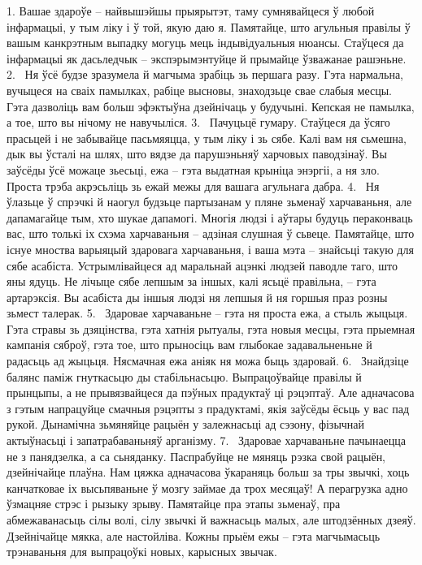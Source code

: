 1. Вашае здароўе – найвышэйшы прыярытэт, таму сумнявайцеся ў любой інфармацыі, у тым ліку і ў той, якую даю я. Памятайце, што агульныя правілы ў вашым канкрэтным выпадку могуць мець індывідуальныя нюансы. Стаўцеся да інфармацыі як дасьледчык – экспэрымэнтуйце й прымайце ўзважанае рашэньне.
2.  Ня ўсё будзе зразумела й магчыма зрабіць зь першага разу. Гэта нармальна, вучыцеся на сваіх памылках, рабіце высновы, знаходзьце свае слабыя месцы. Гэта дазволіць вам больш эфэктыўна дзейнічаць у будучыні. Кепская не памылка, а тое, што вы нічому не навучыліся.
3.  Пачуцьцё гумару. Стаўцеся да ўсяго прасьцей і не забывайце пасьмяяцца, у тым ліку і зь сябе. Калі вам ня сьмешна, дык вы ўсталі на шлях, што вядзе да парушэньняў харчовых паводзінаў. Вы заўсёды ўсё можаце зьесьці, ежа – гэта выдатная крыніца энэргіі, а ня зло. Проста трэба акрэсьліць зь ежай межы для вашага агульнага дабра.
4.  Ня ўлазьце ў спрэчкі й наогул будзьце партызанам у пляне зьменаў харчаваньня, але дапамагайце тым, хто шукае дапамогі. Многія людзі і аўтары будуць пераконваць вас, што толькі іх схэма харчаваньня – адзіная слушная ў сьвеце. Памятайце, што існуе мноства варыяцый здаровага харчаваньня, і ваша мэта – знайсьці такую для сябе асабіста. Устрымлівайцеся ад маральнай ацэнкі людзей паводле таго, што яны ядуць. Не лічыце сябе лепшым за іншых, калі ясьцё правільна, – гэта артарэксія. Вы асабіста ды іншыя людзі ня лепшыя й ня горшыя праз розны зьмест талерак.
5.  Здаровае харчаваньне – гэта ня проста ежа, а стыль жыцьця. Гэта стравы зь дзяцінства, гэта хатнія рытуалы, гэта новыя месцы, гэта прыемная кампанія сяброў, гэта тое, што прыносіць вам глыбокае задавальненьне й радасьць ад жыцьця. Нясмачная ежа аніяк ня можа быць здаровай.
6.  Знайдзіце балянс паміж гнуткасьцю ды стабільнасьцю. Выпрацоўвайце правілы й прынцыпы, а не прывязвайцеся да пэўных прадуктаў ці рэцэптаў. Але адначасова з гэтым напрацуйце смачныя рэцэпты з прадуктамі, якія заўсёды ёсьць у вас пад рукой. Дынамічна зьмяняйце рацыён у залежнасьці ад сэзону, фізычнай актыўнасьці і запатрабаваньняў арганізму.
7.  Здаровае харчаваньне пачынаецца не з панядзелка, а са сьняданку. Паспрабуйце не мяняць рэзка свой рацыён, дзейнічайце плаўна. Нам цяжка адначасова ўкараняць больш за тры звычкі, хоць канчатковае іх высьпяваньне ў мозгу займае да трох месяцаў! А перагрузка адно ўзмацняе стрэс і рызыку зрыву. Памятайце пра этапы зьменаў, пра абмежаванасьць сілы волі, сілу звычкі й важнасьць малых, але штодзённых дзеяў. Дзейнічайце мякка, але настойліва. Кожны прыём ежы – гэта магчымасьць трэнаваньня для выпрацоўкі новых, карысных звычак.
